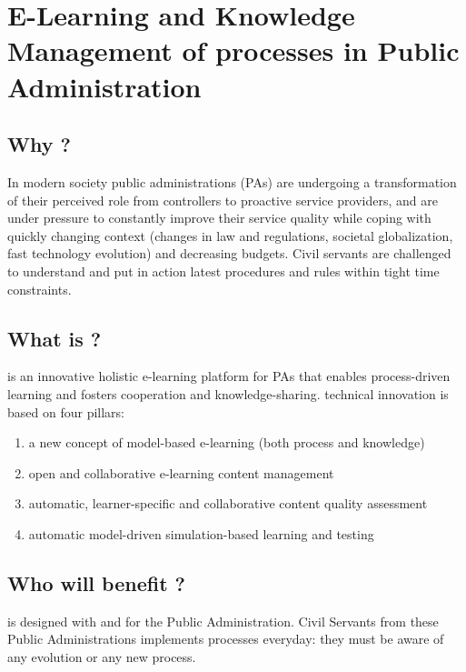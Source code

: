 \documentclass{learnpad}
\begin{document}

\chapter{E-Learning and Knowledge Management of processes in Public Administration}
\label{ch:intro}

\section{Why \learnpad?}
In modern society public administrations (PAs) are undergoing a transformation
of their perceived role from controllers to proactive service providers, and are
under pressure to constantly improve their service quality while coping with
quickly changing context (changes in law and regulations, societal
globalization, fast technology evolution) and decreasing budgets.  Civil
servants are challenged to understand and put in action latest procedures and
rules within tight time constraints.

\section{What is \learnpad?}
\learnpad is an innovative holistic e-learning platform for PAs that enables
process-driven learning and fosters cooperation and knowledge-sharing.
\learnpad technical innovation is based on four pillars:
\begin{enumerate}
	\item a new concept of model-based e-learning (both process and knowledge)
	\item open and collaborative e-learning content management
	\item automatic, learner-specific and collaborative content quality assessment
	\item automatic model-driven simulation-based learning and testing
\end{enumerate}

\section{Who will benefit \learnpad?}
\learnpad is designed with and for the Public Administration.  Civil Servants
from these Public Administrations implements processes everyday: they must be
aware of any evolution or any new process.
\end{document}
